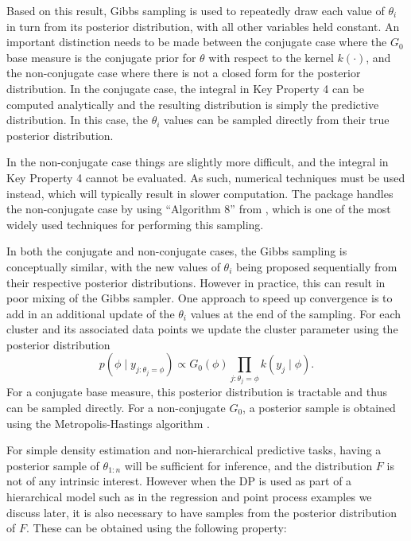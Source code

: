 \documentclass[nojss]{jss}
\begin{document}
Based on this result, Gibbs sampling is used to repeatedly draw each value of $\theta_i$ in turn from
its posterior distribution, with all other variables held constant. An important distinction
needs to be made between the conjugate case where the $G_0$ base measure is the conjugate
prior for $\theta$ with respect to the kernel $k(\cdot)$, and the non-conjugate case where there is not a closed
form for the posterior distribution. In the conjugate case, the integral in Key Property 4 can
be computed analytically and the resulting distribution is simply the predictive distribution.
In this case, the $\theta_i$ values can be sampled directly from their true posterior distribution.

In the non-conjugate case things are slightly more difficult, and the integral in Key Property 4
cannot be evaluated. As such, numerical techniques must be used instead, which will typically
result in slower computation. The  package handles the non-conjugate case
by using ``Algorithm 8'' from \citet{neal_markov_2000}, which is one of the most widely used techniques
for performing this sampling.

In both the conjugate and non-conjugate cases, the Gibbs sampling is conceptually similar,
with the new values of $\theta_i$ being proposed sequentially from their respective posterior distributions.
However in practice, this can result in poor mixing of the Gibbs sampler. One
approach to speed up convergence is to add in an additional update of the $\theta_i$ values at the end of
the sampling. For each cluster and its associated data points we update the cluster parameter
using the posterior distribution
\begin{equation}
p(\phi \mid y_{j:\theta_j=\phi}) \propto G_0(\phi)\prod_{j:\theta_j=\phi} k(y_j \mid \phi).
\label{eq:clusterposterior}
\end{equation}
For a conjugate base measure, this posterior distribution is tractable and thus can be sampled
directly. For a non-conjugate $G_0$, a posterior sample is obtained using the Metropolis-Hastings
algorithm \citep{hastings_monte_1970}.

For simple density estimation and non-hierarchical predictive tasks, having a posterior sample
of $\theta_{1:n}$ will be sufficient for inference, and the distribution $F$ is not of any intrinsic interest.
However when the DP is used as part of a hierarchical model such as in the regression and
point process examples we discuss later, it is also necessary to have samples from the posterior
distribution of $F$. These can be obtained using the following property:
\end{document}
